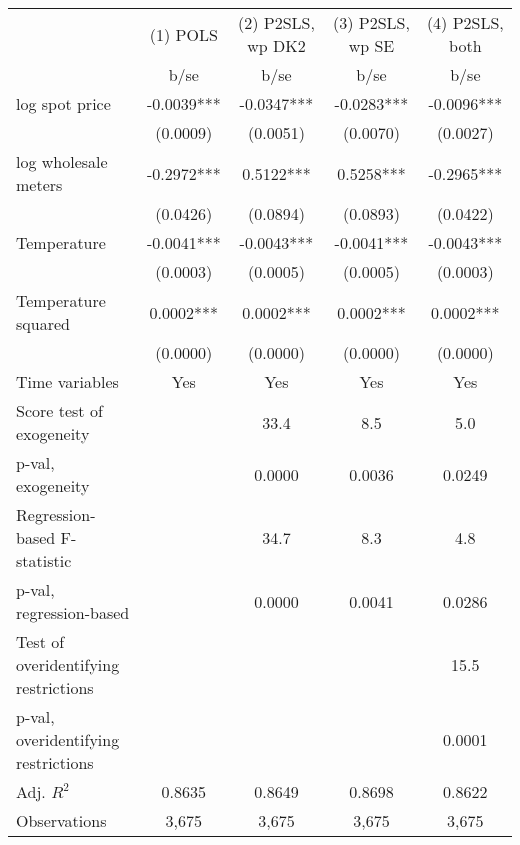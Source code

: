 \begin{tabular}{lcccc}\toprule
                    &    (1) POLS   &(2) P2SLS, wp DK2   &(3) P2SLS, wp SE   &(4) P2SLS, both   \\
                    &        b/se   &        b/se   &        b/se   &        b/se   \\
\midrule
log spot price      &     -0.0039***&     -0.0347***&     -0.0283***&     -0.0096***\\
                    &    (0.0009)   &    (0.0051)   &    (0.0070)   &    (0.0027)   \\
log wholesale meters&     -0.2972***&      0.5122***&      0.5258***&     -0.2965***\\
                    &    (0.0426)   &    (0.0894)   &    (0.0893)   &    (0.0422)   \\
Temperature         &     -0.0041***&     -0.0043***&     -0.0041***&     -0.0043***\\
                    &    (0.0003)   &    (0.0005)   &    (0.0005)   &    (0.0003)   \\
Temperature squared &      0.0002***&      0.0002***&      0.0002***&      0.0002***\\
                    &    (0.0000)   &    (0.0000)   &    (0.0000)   &    (0.0000)   \\
Time variables      &         Yes   &         Yes   &         Yes   &         Yes   \\
\midrule
Score test of exogeneity&               &        33.4   &         8.5   &         5.0   \\
p-val, exogeneity   &               &      0.0000   &      0.0036   &      0.0249   \\
Regression-based F-statistic&               &        34.7   &         8.3   &         4.8   \\
p-val, regression-based&               &      0.0000   &      0.0041   &      0.0286   \\
Test of overidentifying restrictions&               &               &               &        15.5   \\
p-val, overidentifying restrictions&               &               &               &      0.0001   \\
Adj. \(R^2\)        &      0.8635   &      0.8649   &      0.8698   &      0.8622   \\
Observations        &       3,675   &       3,675   &       3,675   &       3,675   \\
\bottomrule\end{tabular}
